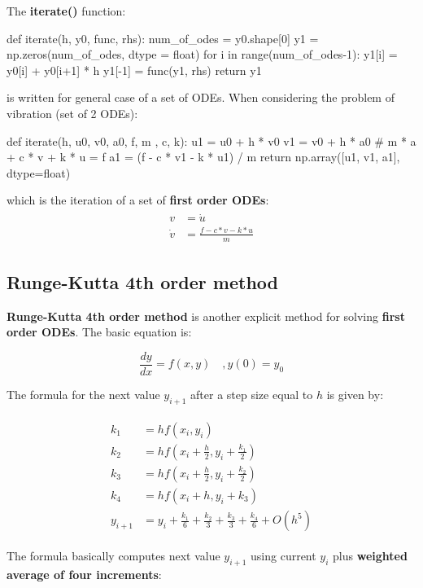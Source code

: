 \documentclass[10pt,b5paper,titlepage]{book}
\newenvironment{ematrix}
{
    \begin{eqnarray}
        \begin{aligned}
}
{
        \end{aligned}
    \end{eqnarray}
}
\begin{document}
The \textbf{iterate()} function:
\begin{python}
def iterate(h, y0, func, rhs):
    num_of_odes = y0.shape[0]
    y1 = np.zeros(num_of_odes, dtype = float)
    for i in range(num_of_odes-1):
        y1[i] = y0[i] + y0[i+1] * h
    y1[-1] = func(y1, rhs)
    return y1

\end{python}

is written for general case of a set of ODEs. When considering the problem
of vibration (set of 2 ODEs):
\begin{python}
def iterate(h, u0, v0, a0, f, m , c, k):
    u1 = u0 + h * v0
    v1 = v0 + h * a0
    # m * a + c * v + k * u = f
    a1 = (f - c * v1 - k * u1) / m
    return np.array([u1, v1, a1], dtype=float)
\end{python}

which is the iteration of a set of \textbf{first order ODEs}:
\begin{ematrix}
    v &= \dot{u}\\
    \dot{v} &= \frac{f - c * v - k * u}{m}
\end{ematrix}

\newpage
\subsection{Runge-Kutta 4th order method}

\textbf{Runge-Kutta 4th order method} is another explicit method for solving
\textbf{first order ODEs}. The basic equation is:

\begin{equation}
    \frac{dy}{dx} = f(x,y) \quad , y(0) = y_0
\end{equation}

The formula for the next value $ y_{i+1} $ after a step size equal to $h $ is given by:

\begin{ematrix}
    k_1 &= h f(x_i, y_i)\\
    k_2 &= h f(x_i + \frac{h}{2}, y_i + \frac{k_1}{2})\\
    k_3 &= h f(x_i + \frac{h}{2}, y_i + \frac{k_2}{2})\\
    k_4 &= h f(x_i + h, y_i + k_3)\\
    y_{i+1} &= y_i + \frac{k_1}{6} + \frac{k_2}{3} + \frac{k_3}{3} + \frac{k_4}{6} + O(h^5)
\end{ematrix}

The formula basically computes next value $ y_{i+1} $ using current $ y_i $ plus
\textbf{weighted average of four increments}:
\end{document}
